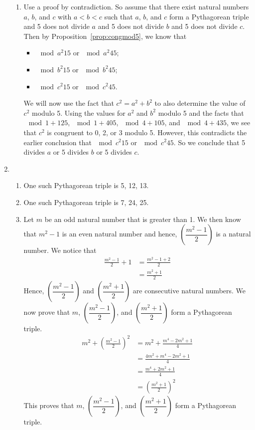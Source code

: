 \begin{enumerate}
\begin{enumerate}
\item Use a proof by contradiction.  So assume that there exist natural numbers $a$, $b$, and $c$ with $a < b < c$ such that $a$, $b$, and $c$ form a Pythagorean triple and 5 does not divide $a$ and 5 does not divide $b$ and 5 does not divide $c$.  Then by Proposition~\ref{prop:congmod5}, we know that
\begin{itemize}
\item $\mod{a^2}{1}{5}$ or $\mod{a^2}{4}{5}$;
\item $\mod{b^2}{1}{5}$ or $\mod{b^2}{4}{5}$;
\item $\mod{c^2}{1}{5}$ or $\mod{c^2}{4}{5}$.
\end{itemize}
We will now use the fact that $c^2 = a^2 + b^2$ to also determine the value of $c^2$ modulo 5.  Using the values for $a^2$ and $b^2$ modulo 5 and the facts that $\mod{1 + 1}{2}{5}$, $\mod{1 + 4}{0}{5}$, $\mod{4 + 1}{0}{5}$, and $\mod{4 + 4}{3}{5}$, we see that $c^2$ is congruent to 0, 2, or 3 modulo 5.  However, this contradicts the earlier conclusion that $\mod{c^2}{1}{5}$ or $\mod{c^2}{4}{5}$.  So we conclude that 5 divides $a$ or 5 divides $b$ or 5 divides $c$.
\end{enumerate}


\item \begin{enumerate}
\item One such Pythagorean triple is 5, 12, 13.
\item One such Pythagorean triple is 7, 24, 25.
\item Let $m$ be an odd natural number that is greater than 1.  We then know that $m^2 - 1$ is an even natural number and hence, $\left( \dfrac{m^2 - 1}{2} \right)$ is a natural number.  We notice that
\begin{align*}
\frac{m^2 - 1}{2} + 1 &= \frac{m^2 - 1 + 2}{2} \\
                      &= \frac{m^2 + 1}{2}
\end{align*}
Hence, $\left( \dfrac{m^2 - 1}{2} \right)$ and $\left( \dfrac{m^2 + 1}{2} \right)$ are consecutive natural numbers.  We now prove that $m$, $\left( \dfrac{m^2 - 1}{2} \right)$, and $\left( \dfrac{m^2 + 1}{2} \right)$ form a Pythagorean triple.
\begin{align*}
m^2 + \left( \frac{m^2 - 1}{2} \right)^2 &= m^2 + \frac{m^4 - 2m^2 + 1}{4} \\
                                         &= \frac{4m^2 + m^4 -2m^2 + 1}{4} \\
                                         &= \frac{m^4 + 2m^2 + 1}{4} \\
                                         &= \left(  \frac{m^2 + 1}{2} \right)^2
\end{align*}
This proves that $m$, $\left( \dfrac{m^2 - 1}{2} \right)$, and $\left( \dfrac{m^2 + 1}{2} \right)$ form a Pythagorean triple.
\end{enumerate}



\end{enumerate}
